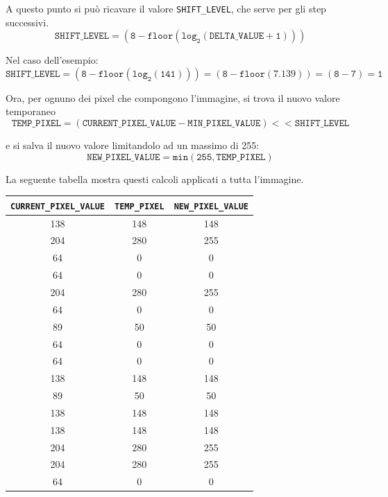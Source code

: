 \documentclass[11pt]{article}
\begin{document}
    A questo punto si può ricavare il valore \texttt{SHIFT\_LEVEL}, che serve per gli step successivi.\\
    $$\mathtt{
    SHIFT\_LEVEL = (8 - floor(log_2(DELTA\_VALUE + 1)))
    }$$
    
    Nel caso dell'esempio:\\
    $$\mathtt{
    SHIFT\_LEVEL = (8 - floor(log_2(141))) = (8 - floor(7.139)) = (8 - 7) = 1
    }$$
    
    Ora, per ognuno dei pixel che compongono l'immagine, si trova il nuovo valore temporaneo\\
    $$\mathtt{
    TEMP\_PIXEL = (CURRENT\_PIXEL\_VALUE - MIN\_PIXEL\_VALUE) << SHIFT\_LEVEL
    }$$
    
    e si salva il nuovo valore limitandolo ad un massimo di 255:\\
    $$\mathtt{
    NEW\_PIXEL\_VALUE = min(255, TEMP\_PIXEL)
    }$$
    
    La seguente tabella mostra questi calcoli applicati a tutta l'immagine.
    
    \renewcommand{\arraystretch}{1.2}
    \begin{center}
        \begin{tabular}{|c|c|c|}
            \hline
            \texttt{CURRENT\_PIXEL\_VALUE} & \texttt{TEMP\_PIXEL} & \texttt{NEW\_PIXEL\_VALUE} \\
            \hline
            138 & 148 & 148 \\
            204 & 280 & 255 \\
            64 & 0 & 0 \\
            64 & 0 & 0 \\
            204 & 280 & 255\\
            64 & 0 & 0 \\
            89 & 50 & 50 \\
            64 & 0 & 0 \\
            64 & 0 & 0 \\
            138 & 148 & 148 \\
            89 & 50 & 50 \\
            138 & 148 & 148 \\
            138 & 148 & 148 \\
            204 & 280 & 255 \\
            204 & 280 & 255 \\
            64 & 0 & 0 \\
            \hline
        \end{tabular}
    \end{center}
    
\end{document}
